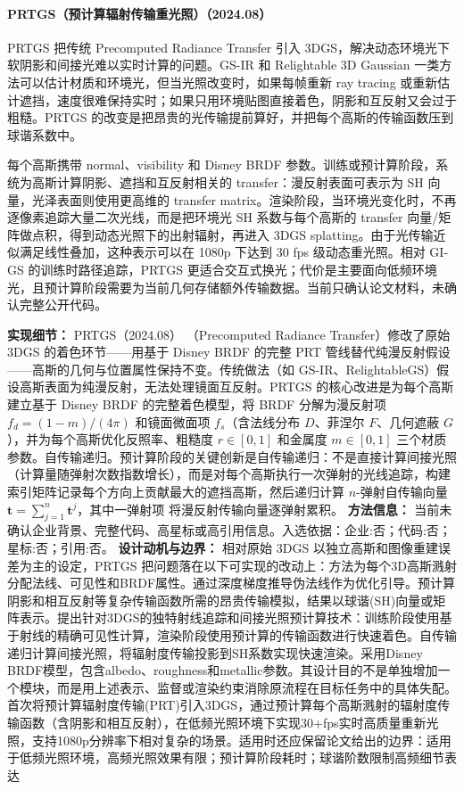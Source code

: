 \paragraph{PRTGS（预计算辐射传输重光照）（2024.08）\cite{2408_03538}}
PRTGS 把传统 Precomputed Radiance Transfer 引入 3DGS，解决动态环境光下软阴影和间接光难以实时计算的问题。GS-IR 和 Relightable 3D Gaussian 一类方法可以估计材质和环境光，但当光照改变时，如果每帧重新 ray tracing 或重新估计遮挡，速度很难保持实时；如果只用环境贴图直接着色，阴影和互反射又会过于粗糙。PRTGS 的改变是把昂贵的光传输提前算好，并把每个高斯的传输函数压到球谐系数中。

每个高斯携带 normal、visibility 和 Disney BRDF 参数。训练或预计算阶段，系统为高斯计算阴影、遮挡和互反射相关的 transfer：漫反射表面可表示为 SH 向量，光泽表面则使用更高维的 transfer matrix。渲染阶段，当环境光变化时，不再逐像素追踪大量二次光线，而是把环境光 SH 系数与每个高斯的 transfer 向量/矩阵做点积，得到动态光照下的出射辐射，再进入 3DGS splatting。由于光传输近似满足线性叠加，这种表示可以在 1080p 下达到 30 fps 级动态重光照。相对 GI-GS 的训练时路径追踪，PRTGS 更适合交互式换光；代价是主要面向低频环境光，且预计算阶段需要为当前几何存储额外传输数据。当前只确认论文材料，未确认完整公开代码。

\textbf{实现细节：} PRTGS（2024.08） （Precomputed Radiance Transfer）修改了原始 3DGS 的着色环节——用基于 Disney BRDF 的完整 PRT 管线替代纯漫反射假设——高斯的几何与位置属性保持不变。传统做法（如 GS-IR、RelightableGS）假设高斯表面为纯漫反射，无法处理镜面互反射。PRTGS 的核心改进是为每个高斯建立基于 Disney BRDF 的完整着色模型，将 BRDF 分解为漫反射项 $f_d = (1-m)/(4\pi)$ 和镜面微面项 $f_s$（含法线分布 $D$、菲涅尔 $F$、几何遮蔽 $G$），并为每个高斯优化反照率、粗糙度 $r \in [0,1]$ 和金属度 $m \in [0,1]$ 三个材质参数。自传输递归。预计算阶段的关键创新是自传输递归：不是直接计算间接光照（计算量随弹射次数指数增长），而是对每个高斯执行一次弹射的光线追踪，构建索引矩阵记录每个方向上贡献最大的遮挡高斯，然后递归计算 $n$-弹射自传输向量 $\mathbf{t} = \sum_{j=1}^{n} \mathbf{t}^j$，其中一弹射项 将漫反射传输向量逐弹射累积。
\textbf{方法信息：} 当前未确认企业背景、完整代码、高星标或高引用信息。入选依据：企业:否；代码:否；星标:否；引用:否。
\textbf{设计动机与边界：} 相对原始 3DGS 以独立高斯和图像重建误差为主的设定，PRTGS 把问题落在以下可实现的改动上：方法为每个3D高斯溅射分配法线、可见性和BRDF属性。通过深度梯度推导伪法线作为优化引导。预计算阴影和相互反射等复杂传输函数所需的昂贵传输模拟，结果以球谐(SH)向量或矩阵表示。提出针对3DGS的独特射线追踪和间接光照预计算技术：训练阶段使用基于射线的精确可见性计算，渲染阶段使用预计算的传输函数进行快速着色。自传输递归计算间接光照，将辐射度传输投影到SH系数实现快速渲染。采用Disney BRDF模型，包含albedo、roughness和metallic参数。其设计目的不是单独增加一个模块，而是用上述表示、监督或渲染约束消除原流程在目标任务中的具体失配。首次将预计算辐射度传输(PRT)引入3DGS，通过预计算每个高斯溅射的辐射度传输函数（含阴影和相互反射），在低频光照环境下实现30+fps实时高质量重新光照，支持1080p分辨率下相对复杂的场景。适用时还应保留论文给出的边界：适用于低频光照环境，高频光照效果有限；预计算阶段耗时；球谐阶数限制高频细节表达
